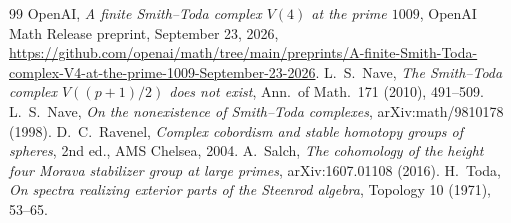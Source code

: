 \documentclass[11pt]{amsart}
\theoremstyle{remark}
\begin{document}
\begin{thebibliography}{99}
 OpenAI, \emph{A finite Smith--Toda complex $V(4)$ at the prime $1009$}, OpenAI Math
Release preprint, September 23, 2026,
\url{https://github.com/openai/math/tree/main/preprints/A-finite-Smith-Toda-complex-V4-at-the-prime-1009-September-23-2026}.
 L.~S.~Nave, \emph{The Smith--Toda complex $V((p+1)/2)$ does not exist}, Ann.\ of Math.\ 171 (2010), 491--509.
 L.~S.~Nave, \emph{On the nonexistence of Smith--Toda complexes}, arXiv:math/9810178 (1998).
 D.~C.~Ravenel, \emph{Complex cobordism and stable homotopy groups of spheres}, 2nd ed., AMS Chelsea, 2004.
 A.~Salch, \emph{The cohomology of the height four Morava stabilizer group at large primes}, arXiv:1607.01108 (2016).
 H.~Toda, \emph{On spectra realizing exterior parts of the Steenrod algebra}, Topology 10 (1971), 53--65.
\end{thebibliography}
\end{document}
